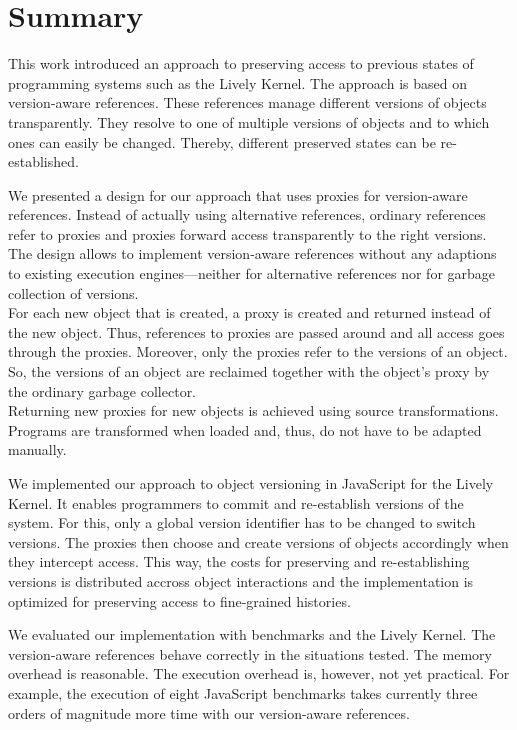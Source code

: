 \chapter{Summary} \label{chapter:SUMMARY}

This work introduced an approach to preserving access to previous states of programming systems such as the Lively Kernel.
The approach is based on version-aware references.
These references manage different versions of objects transparently.
They resolve to one of multiple versions of objects and to which ones can easily be changed.
Thereby, different preserved states can be re-established.

We presented a design for our approach that uses proxies for version-aware references.
Instead of actually using alternative references, ordinary references refer to proxies and proxies forward access transparently to the right versions.
The design allows to implement version-aware references without any adaptions to existing execution engines---neither for alternative references nor for garbage collection of versions.\\
For each new object that is created, a proxy is created and returned instead of the new object.
Thus, references to proxies are passed around and all access goes through the proxies.
Moreover, only the proxies refer to the versions of an object.
So, the versions of an object are reclaimed together with the object's proxy by the ordinary garbage collector.\\
Returning new proxies for new objects is achieved using source transformations.
Programs are transformed when loaded and, thus, do not have to be adapted manually.

We implemented our approach to object versioning in JavaScript for the Lively Kernel.
It enables programmers to commit and re-establish versions of the system.
For this, only a global version identifier has to be changed to switch versions.
The proxies then choose and create versions of objects accordingly when they intercept access.
This way, the costs for preserving and re-establishing versions is distributed accross object interactions and the implementation is optimized for preserving access to fine-grained histories.

We evaluated our implementation with benchmarks and the Lively Kernel.
The version-aware references behave correctly in the situations tested.
The memory overhead is reasonable.
The execution overhead is, however, not yet practical.
For example, the execution of eight JavaScript benchmarks takes currently three orders of magnitude more time with our version-aware references.

